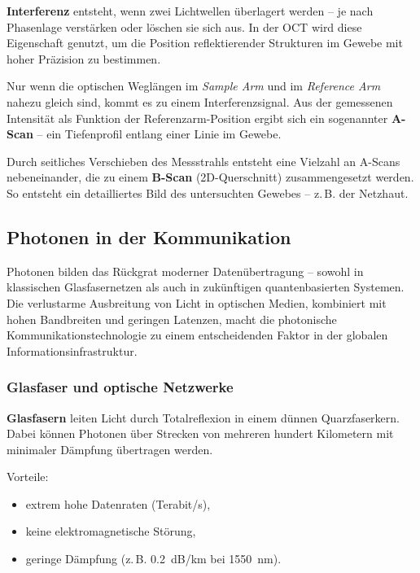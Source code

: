 \begin{tcolorbox}[didaktikbox, title=Didaktische Erläuterung: Interferenz in der OCT]
	\label{box:interferenz_oct}
	\small
	\textbf{Interferenz} entsteht, wenn zwei Lichtwellen überlagert werden – je nach Phasenlage verstärken oder löschen sie sich aus. In der OCT wird diese Eigenschaft genutzt, um die Position reflektierender Strukturen im Gewebe mit hoher Präzision zu bestimmen.
	
	Nur wenn die optischen Weglängen im \emph{Sample Arm} und im \emph{Reference Arm} nahezu gleich sind, kommt es zu einem Interferenzsignal. Aus der gemessenen Intensität als Funktion der Referenzarm-Position ergibt sich ein sogenannter \textbf{A-Scan} – ein Tiefenprofil entlang einer Linie im Gewebe.
	
	Durch seitliches Verschieben des Messstrahls entsteht eine Vielzahl an A-Scans nebeneinander, die zu einem \textbf{B-Scan} (2D-Querschnitt) zusammengesetzt werden. So entsteht ein detailliertes Bild des untersuchten Gewebes – z.\,B. der Netzhaut.
\end{tcolorbox}

\subsection{Photonen in der Kommunikation}

Photonen bilden das Rückgrat moderner Datenübertragung – sowohl in klassischen Glasfasernetzen als auch in zukünftigen quantenbasierten Systemen. Die verlustarme Ausbreitung von Licht in optischen Medien, kombiniert mit hohen Bandbreiten und geringen Latenzen, macht die photonische Kommunikationstechnologie zu einem entscheidenden Faktor in der globalen Informationsinfrastruktur.

\subsubsection{Glasfaser und optische Netzwerke}

\textbf{Glasfasern} leiten Licht durch Totalreflexion in einem dünnen Quarzfaserkern. Dabei können Photonen über Strecken von mehreren hundert Kilometern mit minimaler Dämpfung übertragen werden.

Vorteile:
\begin{itemize}
	\item extrem hohe Datenraten (Terabit/s),
	\item keine elektromagnetische Störung,
	\item geringe Dämpfung (z.\,B. \SI{0.2}{dB/km} bei \SI{1550}{nm}).
\end{itemize}

